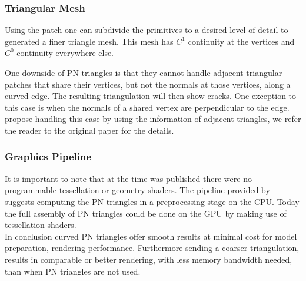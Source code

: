 \subsubsection*{Triangular Mesh}
Using the patch one can subdivide the primitives to a desired level of detail to generated a finer triangle mesh. This mesh has $C^1$ continuity at the vertices and $C^0$ continuity everywhere else.  

One downside of PN triangles is that they cannot handle adjacent triangular patches that share their vertices, but not the normals at those vertices, along a curved edge. The resulting triangulation will then show cracks. One exception to this case is when the normals of a shared vertex are perpendicular to the edge. \citeauthor{vlachos2001curved} propose handling this case by using the information of adjacent triangles, we refer the reader to the original paper for the details.

\subsubsection*{Graphics Pipeline}
It is important to note that at the time \textcite{vlachos2001curved} was published there were no programmable tessellation or geometry shaders. The pipeline provided by \citeauthor{vlachos2001curved} suggests computing the PN-triangles in a preprocessing stage on the CPU. Today the full assembly of PN triangles could be done on the GPU by making use of tessellation shaders.\\

In conclusion curved PN triangles offer smooth results at minimal cost for model preparation, rendering performance. Furthermore sending a coarser triangulation, results in comparable or better rendering, with less memory bandwidth needed, than when PN triangles are not used. 